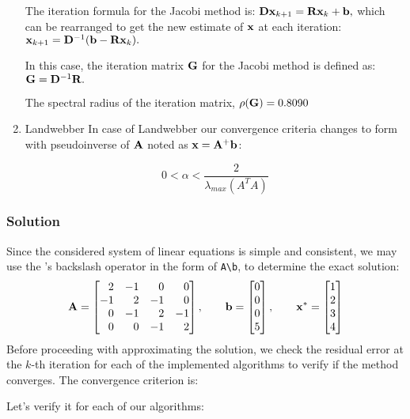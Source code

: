 \begin{enumerate}
    The iteration formula for the Jacobi method is:
    $ \mathbf{Dx}_{k+1} = \mathbf{Rx}_k + \mathbf{b}, $
    which can be rearranged to get the new estimate of $ \mathbf{x} $ at each iteration:
    $ \mathbf{x}_{k+1} = \mathbf{D}^{-1}(\mathbf{b} - \mathbf{Rx}_k). $

    In this case, the iteration matrix $ \mathbf{G} $ for the Jacobi method is defined as:
    $ \mathbf{G} = \mathbf{D}^{-1}\mathbf{R}. $

    The spectral radius of the iteration matrix, $ \rho(\mathbf{G}) = 0.8090$

  \item Landwebber
  In case of Landwebber our convergence criteria changes to form with pseudoinverse of $\mathbf{A}$ noted as $\mathbf{x} = \mathbf{A}^+ \mathbf{b}$:
  
  \begin{equation*}
    0 < \alpha < \frac{2}{\lambda_{max}(A^TA)}
  \end{equation*}
\end{enumerate}



\subsubsection*{Solution}
Since the considered system of linear equations is simple and consistent, we may use the
\MATLAB's backslash operator in the form of \lstinline[style=Matlab-editor]{A\b}, to
determine the exact solution:
\begin{equation*}
  \mathbf{A} = \begin{bmatrix}
    \phantom{-}2 & -1 & \phantom{-}0 & \phantom{-}0 \\
    -1 & \phantom{-}2 & -1 & \phantom{-}0 \\
    \phantom{-}0 & -1 & \phantom{-}2 & -1 \\
    \phantom{-}0 & \phantom{-}0 & -1 & \phantom{-}2
  \end{bmatrix}, \qquad
  \mathbf{b} = \begin{bmatrix}
    0 \\
    0 \\
    0 \\
    5
  \end{bmatrix}, \qquad
  \mathbf{x}^* = \begin{bmatrix}
    1 \\
    2 \\
    3 \\
    4
  \end{bmatrix}
\end{equation*}
Before proceeding with approximating the solution, we check the residual error
at the $k$-th iteration for each of the implemented algorithms to verify if the method
converges. The convergence criterion is:

Let's verify it for each of our algorithms:


